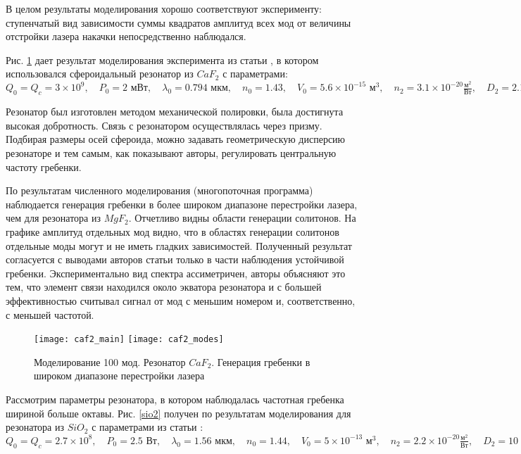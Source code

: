 В целом результаты моделирования хорошо соответствуют эксперименту: ступенчатый вид зависимости суммы квадратов амплитуд всех мод от величины отстройки лазера накачки непосредственно наблюдался.

Рис. \ref{caf2} дает результат моделирования эксперимента из статьи \cite{matsko_nature}, в котором использовался сфероидальный резонатор из $CaF_2$ с параметрами:
$
Q_0=Q_c=3\times10^9,\quad
P_0=2\text{ мВт},\quad
\lambda_0=0.794\text{ мкм}, \quad
n_0=1.43,\quad
V_0=5.6\times10^{-15}\text{ м}^3,\quad
n_2=3.1\times10^{-20}\frac{\text{м}^2}{\text{Вт}},\quad
D_2=2.1\times10^4\text{ Гц},\quad
D_3=0\text{ Гц}.$

Резонатор был изготовлен методом механической полировки, была достигнута высокая добротность. Связь с резонатором осуществлялась через призму. Подбирая размеры осей сфероида, можно задавать геометрическую дисперсию резонаторе и тем самым, как показывают авторы, регулировать центральную частоту гребенки.

По результатам численного моделирования (многопоточная программа) наблюдается генерация гребенки в более широком диапазоне перестройки лазера, чем для резонатора из $MgF_2$. Отчетливо видны области генерации солитонов. На графике амплитуд отдельных мод видно, что в областях генерации солитонов отдельные моды могут и не иметь гладких зависимостей. Полученный результат согласуется с выводами авторов статьи только в части наблюдения устойчивой гребенки. Экспериментально вид спектра ассиметричен, авторы объясняют это тем, что элемент связи находился около экватора резонатора и с большей эффективностью считывал сигнал от мод с меньшим номером и, соответственно, с меньшей частотой.

\begin{figure}
  \texttt{[image: caf2\_main]}
  \texttt{[image: caf2\_modes]}
  \caption{Моделирование 100 мод. Резонатор $CaF_2$. Генерация гребенки в широком диапазоне перестройки лазера} \label{caf2}
\end{figure}

Рассмотрим параметры резонатора, в котором наблюдалась частотная гребенка шириной больше октавы. Рис. \ref{sio2} получен по результатам моделирования для резонатора из $SiO_2$ с параметрами из статьи \cite{octave_comb_2011} :
$
Q_0=Q_c=2.7\times10^8,\quad
P_0=2.5\text{ Вт},\quad
\lambda_0=1.56\text{ мкм}, \quad
n_0=1.44,\quad
V_0=5\times10^{-13}\text{ м}^3,\quad
n_2=2.2\times10^{-20}\frac{\text{м}^2}{\text{Вт}},\quad
D_2=10\times10^6\text{ Гц},\quad
D_3=0.$


